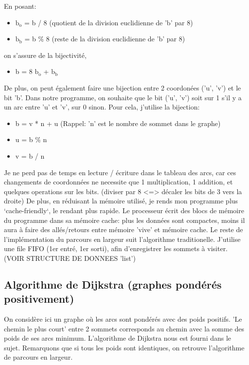 \documentclass[a4paper,10pt]{article}
\begin{document}
    En posant:
    \begin{itemize}[label=-]
      \item $\textrm{b}_\textrm{o}$ = b / 8 (quotient de la division euclidienne de 'b' par 8)
      \item $\textrm{b}_\textrm{b}$ = b \% 8 (reste de la division euclidienne de 'b' par 8)
    \end{itemize}
    on s'assure de la bijectivité,
    \begin{itemize}[label=-]
      \item b = 8 $\textrm{b}_\textrm{o}$ + $\textrm{b}_\textrm{b}$
    \end{itemize}
    De plus, on peut également faire une bijection entre 2 coordonées ('u', 'v') et le bit 'b'.
    Dans notre programme, on souhaite que le bit ('u', 'v') soit sur 1 s'il y a un arc entre 'u' et 'v', sur 0 sinon.
    Pour cela, j'utilise la bijection:
    \begin{itemize}[label=-]
      \item b = v * n + u (Rappel: 'n' est le nombre de sommet dans le graphe)
      \item u = b \% n
      \item v = b / n
    \end{itemize}
    Je ne perd pas de temps en lecture / écriture dans le tableau des arcs, car ces changements
    de coordonnées ne necessite que 1 multiplication, 1 addition, et quelques operations sur les bits.\newline
    (diviser par 8 <=> décaler les bits de 3 vers la droite)\newline
    De plus, en réduisant la mémoire utilisé, je rends mon programme plus `cache-friendly`, le rendant plus rapide.
    Le processeur écrit des blocs de mémoire du programme dans sa mémoire cache: plus les données sont compactes,
    moins il aura à faire des allés/retours entre mémoire 'vive' et mémoire cache.\newline
    Le reste de l'implémentation du parcours en largeur suit l'algorithme traditionelle.
    J'utilise une file FIFO (1er entré, 1er sorti), afin d'enregistrer les sommets à visiter.\newline
    (VOIR STRUCTURE DE DONNEES 'list') 
    
  \newpage
  \subsection{Algorithme de Dijkstra (graphes pondérés positivement)}
    On considère ici un graphe où les arcs sont pondérés avec des poids positifs.\newline
    'Le chemin le plus court' entre 2 sommets corresponds au chemin avec la somme des poids de ses arcs minimum.\newline
     L'algorithme de Dijkstra nous est fourni dans le sujet. Remarquons que si tous les poids sont identiques,
     on retrouve l'algorithme de parcours en largeur.\newline
\end{document}
